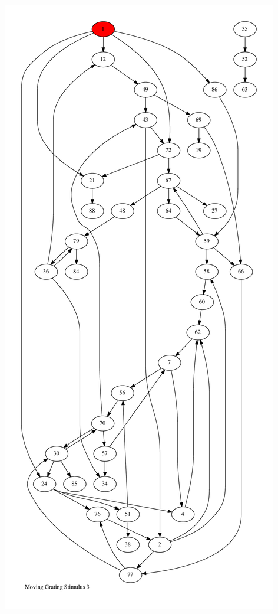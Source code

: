 \documentclass{article}
\begin{document}
\newpage
\includegraphics[max height=\textheight,max width=\textwidth]{stim_mov_grat/stim3_pp.pdf}
\end{document}
